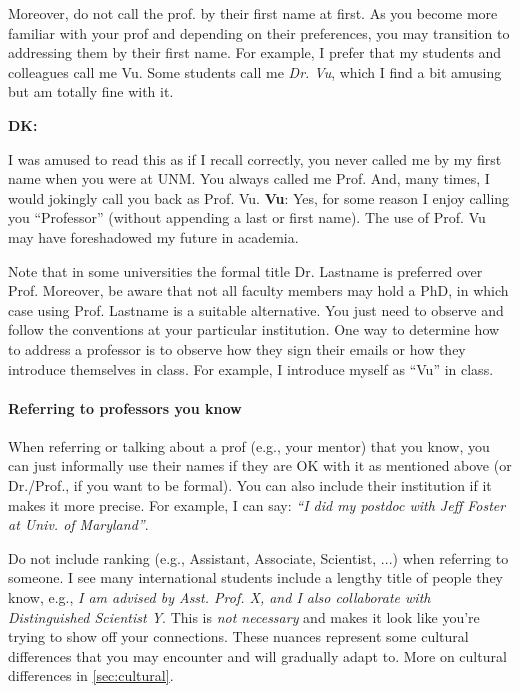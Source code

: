 \documentclass[oneside,11pt,dvipsnames]{book}
\newenvironment{commentbox}[1][]{
  \small
  \begin{mybox}
    {\small \textbf{#1}}
  }{
  \end{mybox}
}
\begin{document}
Moreover, do not call the prof. by their first name at first.  As you become more familiar with your prof and depending on their preferences, you may transition to addressing them by their first name.
For example, I prefer that my students and colleagues call me Vu. Some students call me \emph{Dr. Vu}, which I find a bit amusing but am totally fine with it.

\begin{commentbox}[DK:]
  I was amused to read this as if I recall correctly, you never called me by my first name when you were at UNM. You always called me Prof. And, many times, I would jokingly call you back as Prof. Vu.
  \tcblower
  \textbf{Vu}: Yes, for some reason I enjoy calling you ``Professor'' (without appending a last or first name).  The use of Prof. Vu may have foreshadowed my future in academia.
\end{commentbox}

Note that in some universities the formal title Dr. Lastname is preferred over Prof. Moreover, be aware that not all faculty members may hold a PhD, in which case using Prof. Lastname is a suitable alternative. 	You just need to observe and follow the conventions at your particular institution. One way to determine how to address a professor is to observe how they sign their emails or how they introduce themselves in class. For example, I introduce myself as ``Vu'' in class.



\paragraph{Referring to professors you know} When referring or talking about a prof (e.g., your mentor) that you know, you can just informally use their names if they are OK with it as mentioned above (or Dr./Prof., if you want to be formal). You can also include their institution if it makes it more precise.  For example, I can say:  \emph{``I did my postdoc with Jeff Foster at Univ. of Maryland''}.

Do not include ranking (e.g., Assistant, Associate, Scientist, ...) when referring to someone. I see many international students include a lengthy title of people they know, e.g., \emph{I am advised by Asst. Prof. X, and I also collaborate with Distinguished Scientist Y}.  This is \emph{not necessary} and makes it look like you're trying to show off your connections. These nuances represent some cultural differences that you may encounter and will gradually adapt to. More on cultural differences in \autoref{sec:cultural}.
\end{document}
